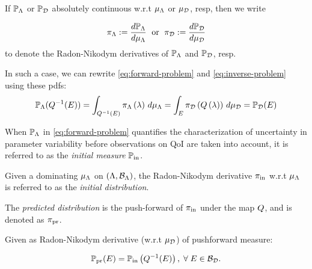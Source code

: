\begin{frame}

\begin{defn}\label{defn:consistent-solution}
  If $\mathbb{P}_{\Lambda}$ or $\mathbb{P}_{\mathcal{D}}$ absolutely continuous w.r.t $\mu_{{\Lambda}}$ or $\mu_{\mathcal{D}}$, resp, then we write

  \begin{equation*}
    \pi_{\Lambda} := \frac{d\mathbb{P}_{\Lambda}}{d\mu_{{\Lambda}}} \;\text{ or }\; \pi_{\mathcal{D}} := \frac{d\mathbb{P}_{\mathcal{D}}}{d\mu_{\mathcal{D}}}
  \end{equation*}
  to denote the Radon-Nikodym derivatives of $\mathbb{P}_{\Lambda}$ and $\mathbb{P}_{\mathcal{D}}$, resp.
  \bigskip

  In such a case, we can rewrite \eqref{eq:forward-problem} and \eqref{eq:inverse-problem} using these pdfs:
  \begin{equation*}
  \mathbb{P}_{\Lambda} (Q^{-1}(E)) = \int_{Q^{-1}(E)} \pi_{\Lambda} \left ( \lambda \right ) \, d\mu_{{\Lambda}} = \int_E \pi_{\mathcal{D}} \left ( Q\left ( \lambda \right ) \right ) \, d\mu_{\mathcal{D}} = \mathbb{P}_{\mathcal{D}}(E)
  \end{equation*}

\end{defn}

\end{frame}


\begin{frame}

\begin{defn}\label{defn:initial}
  When $\mathbb{P}_{\Lambda}$ in \eqref{eq:forward-problem} quantifies the characterization of uncertainty in parameter variability before observations on QoI are taken into account, it is referred to as the \emph{initial measure} $\operatorname*{\mathbb{P}_{in}}$.

  \bigskip
  Given a dominating $\mu_{\Lambda}$ on $({\Lambda}, \mathcal{B}_{{\Lambda}})$, the Radon-Nikodym derivative $\operatorname*{\pi_{in}}$ w.r.t $\mu_{{\Lambda}}$ is referred to as the \emph{initial distribution}.

\end{defn}

\end{frame}


\begin{frame}
\begin{defn}\label{defn:predicted}
 The \emph{predicted distribution} is the push-forward of $\operatorname*{\pi_{in}}$ under the map $Q$, and is denoted as $\operatorname*{\pi_{pr}}$.

 \bigskip
  Given as Radon-Nikodym derivative (w.r.t $\mu_{\mathcal{D}}$) of pushforward measure:

 \begin{equation}\label{eq:predicted}
    \operatorname*{\mathbb{P}_{pr}} (E) = \operatorname*{\mathbb{P}_{in}} \left ( Q^{-1}(E) \right ), \; \forall \; E \in \mathcal{B}_{\mathcal{D}}.
  \end{equation}

\end{defn}

\end{frame}


